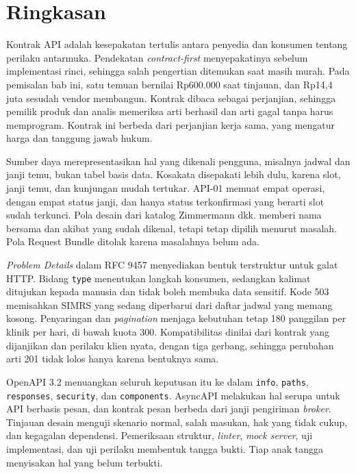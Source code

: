 \section{Ringkasan}

Kontrak API adalah kesepakatan tertulis antara penyedia dan konsumen tentang perilaku antarmuka. Pendekatan \textit{contract-first} menyepakatinya sebelum implementasi rinci, sehingga salah pengertian ditemukan saat masih murah. Pada pemisalan bab ini, satu temuan bernilai Rp600.000 saat tinjauan, dan Rp14,4 juta sesudah vendor membangun. Kontrak
dibaca sebagai perjanjian, sehingga pemilik produk dan analis memeriksa arti berhasil dan arti gagal tanpa harus memprogram. Kontrak ini berbeda dari perjanjian kerja sama, yang mengatur harga dan tanggung jawab hukum.

Sumber daya merepresentasikan hal yang dikenali pengguna, misalnya jadwal dan janji temu, bukan tabel basis data. Kosakata disepakati lebih dulu, karena slot, janji temu, dan kunjungan mudah tertukar. API-01 memuat empat operasi, dengan empat status janji, dan hanya status terkonfirmasi yang berarti slot sudah terkunci. Pola desain dari katalog Zimmermann
dkk. memberi nama bersama dan akibat yang sudah dikenal, tetapi tetap dipilih menurut masalah. Pola Request Bundle ditolak karena masalahnya belum ada.

\textit{Problem Details} dalam RFC 9457 menyediakan bentuk terstruktur untuk galat HTTP. Bidang \texttt{type} menentukan langkah konsumen, sedangkan kalimat ditujukan kepada manusia dan tidak boleh membuka data sensitif. Kode 503 memisahkan SIMRS yang sedang diperbarui dari daftar jadwal yang memang kosong. Penyaringan dan \textit{pagination} menjaga kebutuhan tetap
180 panggilan per klinik per hari, di bawah kuota 300. Kompatibilitas dinilai dari kontrak yang dijanjikan dan perilaku klien nyata, dengan tiga gerbang, sehingga perubahan arti 201 tidak lolos hanya karena bentuknya sama.

OpenAPI 3.2 menuangkan seluruh keputusan itu ke dalam \texttt{info}, \texttt{paths}, \texttt{responses}, \texttt{security}, dan \texttt{components}. AsyncAPI melakukan hal serupa untuk API berbasis pesan, dan kontrak pesan berbeda dari janji pengiriman \textit{broker}. Tinjauan desain menguji skenario normal, salah masukan, hak yang tidak cukup, dan kegagalan dependensi.
Pemeriksaan struktur, \textit{linter}, \textit{mock server}, uji implementasi, dan uji perilaku membentuk tangga bukti. Tiap anak tangga menyisakan hal yang belum terbukti.

